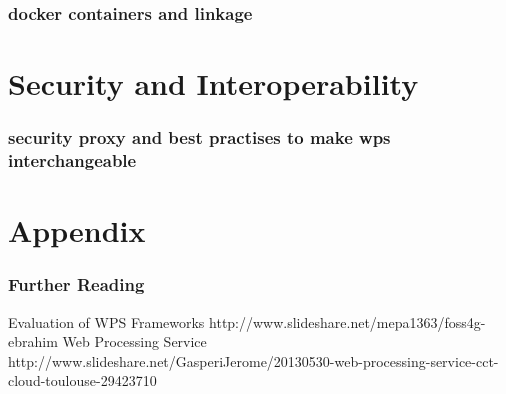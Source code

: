 \documentclass{beamer}
\begin{document}
  \begin{frame}
    \frametitle{docker containers and linkage}
  \end{frame}


  \section{Security and Interoperability}

  \begin{frame}
    \frametitle{security proxy and best practises to make wps interchangeable}
  \end{frame}

  \appendix

  \section{Appendix}
  
   \begin{frame}[allowframebreaks]
    \frametitle<presentation>{Further Reading}    
    \begin{thebibliography}{10}    
      \beamertemplatearticlebibitems
      Evaluation of WPS Frameworks
      \newblock http://www.slideshare.net/mepa1363/foss4g-ebrahim
      Web Processing Service
      \newblock http://www.slideshare.net/GasperiJerome/20130530-web-processing-service-cct-cloud-toulouse-29423710
    \end{thebibliography}
  \end{frame}
  
\end{document}
